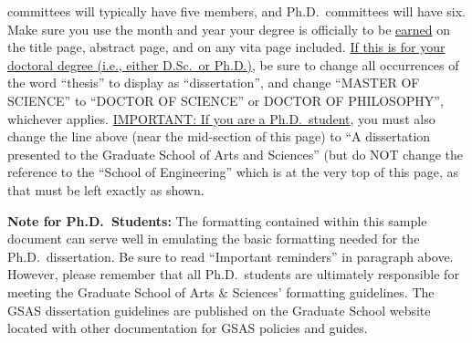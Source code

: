 \begin{thesistitlepage}
\begin{singlespace}
committees will typically have five members, and Ph.D.\ committees will have
six.  Make sure you use the month and year your degree is officially to be
\uline{earned} on the title page, abstract page, and on any vita page included.
\uline{If this is for your doctoral degree (i.e., either D.Sc.\ or Ph.D.)}, be
sure to change all occurrences of the word ``thesis'' to display as
``dissertation'', and change ``MASTER OF SCIENCE'' to ``DOCTOR OF SCIENCE'' or
DOCTOR OF PHILOSOPHY'', whichever applies.   \uline{IMPORTANT:  If you are a
Ph.D.\ student}, you must also change the line above (near the mid-section of
this page) to ``A dissertation presented to the Graduate School of Arts and
Sciences'' (but do NOT change the reference to the ``School of Engineering''
which is at the very top of this page, as that must be left exactly as shown.

{\small \textbf{Note for Ph.D.\ Students:}}
The formatting contained within this sample document can serve well in
emulating the basic formatting needed for the Ph.D.\ dissertation.  Be sure to
read ``Important reminders'' in paragraph above.\\ However, please remember
that all Ph.D.\ students are ultimately responsible for meeting the Graduate
School of Arts \& Sciences' formatting guidelines.  The GSAS dissertation
guidelines are published on the Graduate School website located with other
documentation for GSAS policies and guides.

\end{singlespace}
\end{thesistitlepage}

